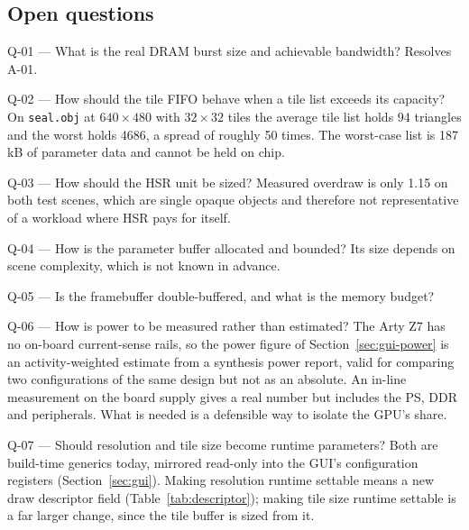 \documentclass[11pt,a4paper]{article}
\begin{document}
\subsection{Open questions}

\begin{records}
\item[Q-01 --- What is the real DRAM burst size and achievable bandwidth?]
Resolves A-01.

\item[Q-02 --- How should the tile FIFO behave when a tile list exceeds its
capacity?]
On \texttt{seal.obj} at $640\times480$ with $32\times32$ tiles the average tile
list holds 94 triangles and the worst holds 4686, a spread of roughly 50 times.
The worst-case list is 187\,kB of parameter data and cannot be held on chip.

\item[Q-03 --- How should the HSR unit be sized?]
Measured overdraw is only 1.15 on both test scenes, which are single opaque
objects and therefore not representative of a workload where HSR pays for
itself.

\item[Q-04 --- How is the parameter buffer allocated and bounded?]
Its size depends on scene complexity, which is not known in advance.

\item[Q-05 --- Is the framebuffer double-buffered, and what is the memory
budget?]

\item[Q-06 --- How is power to be measured rather than estimated?]
The Arty Z7 has no on-board current-sense rails, so the power figure of
Section~\ref{sec:gui-power} is an activity-weighted estimate from a synthesis
power report, valid for comparing two configurations of the same design but not
as an absolute. An in-line measurement on the board supply gives a real number
but includes the PS, DDR and peripherals. What is needed is a defensible way to
isolate the GPU's share.

\item[Q-07 --- Should resolution and tile size become runtime parameters?]
Both are build-time generics today, mirrored read-only into the GUI's
configuration registers (Section~\ref{sec:gui}). Making resolution runtime
settable means a new draw descriptor field (Table~\ref{tab:descriptor});
making tile size runtime settable is a far larger change, since the tile buffer
is sized from it.
\end{records}
\end{document}
